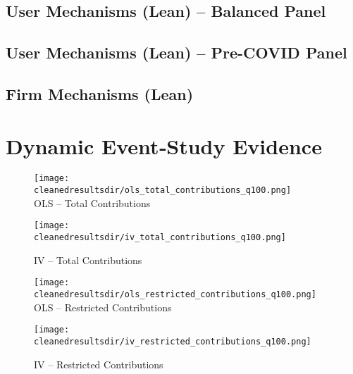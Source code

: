 \documentclass{article}
\newcommand{\cleanedresultsdir}{../results/cleaned}
\begin{document}
\begin{landscape}
\subsection{User Mechanisms (Lean) -- Balanced Panel}

\end{landscape}

\begin{landscape}
\subsection{User Mechanisms (Lean) -- Pre-COVID Panel}

\end{landscape}

\clearpage
\begin{landscape}
\subsection{Firm Mechanisms (Lean)}

\end{landscape}

\clearpage
\section{Dynamic Event‐Study Evidence}


\begin{figure}[H]
  \centering
  \texttt{[image: \\cleanedresultsdir/ols\_total\_contributions\_q100.png]}\\[2pt]
  \caption*{OLS – Total Contributions}
  \texttt{[image: \\cleanedresultsdir/iv\_total\_contributions\_q100.png]}\\[2pt]
  \caption*{IV – Total Contributions}
\end{figure}

\clearpage

\begin{figure}[H]
  \centering
  \texttt{[image: \\cleanedresultsdir/ols\_restricted\_contributions\_q100.png]}\\[2pt]
  \caption*{OLS – Restricted Contributions}
  \texttt{[image: \\cleanedresultsdir/iv\_restricted\_contributions\_q100.png]}\\[2pt]
  \caption*{IV – Restricted Contributions}
\end{figure}
\end{document}
